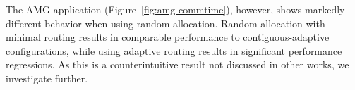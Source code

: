 The AMG application (Figure~\ref{fig:amg-commtime}), however, shows markedly
different behavior when using random allocation. Random allocation with minimal
routing results in comparable performance to contiguous-adaptive configurations,
while using adaptive routing results in significant performance regressions. As
this is a counterintuitive result not discussed in other works, we investigate
further.

\begin{comment} JJ - doing some reorg, so keeping the old text just in case
Now that the system-level view has been analyzed, we turn to evaluate the behavior of each application within Workload~\Rmnum{1}.
Figure~\ref{fig:apps-commtime} shows the communication time distribution across application ranks for different placement and routing configurations.
As shown in Figure~\ref{fig:mg-commtime}, 
MultiGrid takes the most communication time when it is running with contiguous placement and minimal routing (CM). 
When contiguous placement coupled with adaptive or progressive adaptive routing (CA, CPA) are in use, 
the communication time is significantly reduced. 
Random placement coupled with minimal routing (RM) can make further improvement, 
and reaches the best performance(lowest communication time) when coupled with adaptive and progressive adaptive routing(RA, RPA). 
Due to the variance of data transfer amount among MPI ranks, 
MultiGrid communication time also presents great variation, 
indicating by the long boxes in Figure~\ref{fig:mg-commtime}.

CrystalRouter takes more communication time compared with the other applications because of its high volume of data transfer. 
When it is running with six placement and routing configurations, 
CrystalRouter communication time presents similarly trend as MultiGrid but with little variance, shown in Figure~\ref{fig:cr-commtime}. 


AMG is quite an exception. 
The communication time of AMG running with different placement and routing configuration are shown in Figure~\ref{fig:amg-commtime}.
When contiguous placement is in use, AMG behaves similarly as MultiGrid and CrystalRouter over three routing policies. 
It takes comparable amount of communication time when contiguous placement coupled with adaptive and progressive routing. 
When coupled with minimal routing, the communication time almost doubles. 
The communication time skyrockets when random placement coupled with (progressive) adaptive routing (RPA, RA) are in use. Minimal routing (RM) can mitigate this performance degradation, but still worse than CA and CPA. We observe that when Workload~\Rmnum{1} is running with random placement and (progressive) adaptive routing, 
the performance of MultiGrid and CrystalRouter are significant improved, whereas AMG suffers performance degradation. 
\end{comment}


